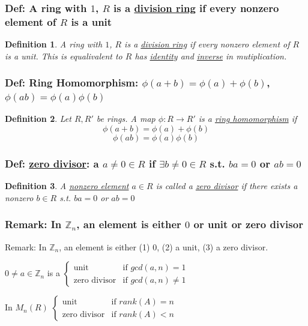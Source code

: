 \documentclass[11pt,a4paper]{article}
\newtheorem{definition}{Definition}
\begin{document}
\subsubsection{Def: A ring with $1$, $R$ is a \underline{division ring} if every nonzero element of $R$ is a unit}
\begin{definition}
    A ring with $1$, $R$ is a \underline{division ring} if every nonzero element of $R$ is a unit. This is equalivalent to $R$ has \underline{identity} and \underline{inverse} in mutiplication.
\end{definition}

\subsubsection{Def: Ring Homomorphism: $\phi(a+b)=\phi(a)+\phi(b)$, $\phi(ab)=\phi(a)\phi(b)$}
\begin{definition}
    Let $R,R'$ be rings. A map $\phi:R \rightarrow R'$ is a \underline{ring homomorphism} if $$\phi(a+b)=\phi(a)+\phi(b)$$ $$\phi(ab)=\phi(a)\phi(b)$$
\end{definition}

\subsubsection{Def: \underline{zero divisor}: a $a\neq 0\in R$ if $\exists b\neq 0\in R$ s.t. $ba=0$ or $ab=0$}
\begin{definition}
    A \underline{nonzero element} $a\in R$ is called a \underline{zero divisor} if there exists a nonzero $b\in R$ s.t. $ba=0$ or $ab=0$
\end{definition}

\subsubsection{Remark: In $\mathbb{Z}_n$, an element is either $0$ or unit or zero divisor}
Remark: In $\mathbb{Z}_n$, an element is either (1) 0, (2) a unit, (3) a zero divisor.

$0\neq a\in \mathbb{Z}_n$ is a $\left\{\begin{matrix}
    \text{unit}&\text{if }gcd(a,n)=1\\
    \text{zero divisor}&\text{if }gcd(a,n)\neq 1
\end{matrix}\right.$

In $M_n(R)$ $\left\{\begin{matrix}
    \text{unit}&\text{if }rank(A)=n\\
    \text{zero divisor}&\text{if }rank(A)<n
\end{matrix}\right.$
\end{document}
